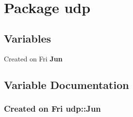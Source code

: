 \section{Package udp}
\label{namespaceudp}


\subsection*{Variables}
\begin{CompactItemize}
\item 
Created on Fri {\bf Jun}
\end{CompactItemize}


\subsection{Variable Documentation}
\subsubsection{\setlength{\rightskip}{0pt plus 5cm}Created on Fri udp::Jun}\label{namespaceudp_a0}


